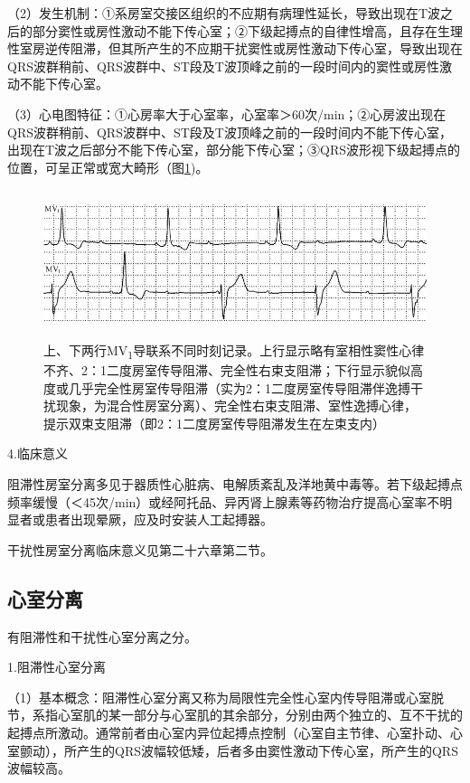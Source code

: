 （2）发生机制：①系房室交接区组织的不应期有病理性延长，导致出现在T波之后的部分窦性或房性激动不能下传心室；②下级起搏点的自律性增高，且存在生理性室房逆传阻滞，但其所产生的不应期干扰窦性或房性激动下传心室，导致出现在QRS波群稍前、QRS波群中、ST段及T波顶峰之前的一段时间内的窦性或房性激动不能下传心室。

（3）心电图特征：①心房率大于心室率，心室率＞60次/min；②心房波出现在QRS波群稍前、QRS波群中、ST段及T波顶峰之前的一段时间内不能下传心室，出现在T波之后部分不能下传心室，部分能下传心室；③QRS波形视下级起搏点的位置，可呈正常或宽大畸形（图\ref{fig30-4})。

\begin{figure}[!htbp]
 \centering
 \includegraphics[width=5.58333in,height=1.70833in]{./images/Image00499.jpg}
 \captionsetup{justification=centering}
 \caption{上、下两行MV\textsubscript{1}导联系不同时刻记录。上行显示略有室相性窦性心律不齐、2：1二度房室传导阻滞、完全性右束支阻滞；下行显示貌似高度或几乎完全性房室传导阻滞（实为2：1二度房室传导阻滞伴逸搏干扰现象，为混合性房室分离）、完全性右束支阻滞、室性逸搏心律，提示双束支阻滞（即2：1二度房室传导阻滞发生在左束支内）}
 \label{fig30-4}
  \end{figure} 


4.临床意义

阻滞性房室分离多见于器质性心脏病、电解质紊乱及洋地黄中毒等。若下级起搏点频率缓慢（＜45次/min）或经阿托品、异丙肾上腺素等药物治疗提高心室率不明显者或患者出现晕厥，应及时安装人工起搏器。

干扰性房室分离临床意义见第二十六章第二节。

\protect\hypertarget{text00037.htmlux5cux23subid434}{}{}

\subsection{心室分离}

有阻滞性和干扰性心室分离之分。

1.阻滞性心室分离

（1）基本概念：阻滞性心室分离又称为局限性完全性心室内传导阻滞或心室脱节，系指心室肌的某一部分与心室肌的其余部分，分别由两个独立的、互不干扰的起搏点所激动。通常前者由心室内异位起搏点控制（心室自主节律、心室扑动、心室颤动），所产生的QRS波幅较低矮，后者多由窦性激动下传心室，所产生的QRS波幅较高。

